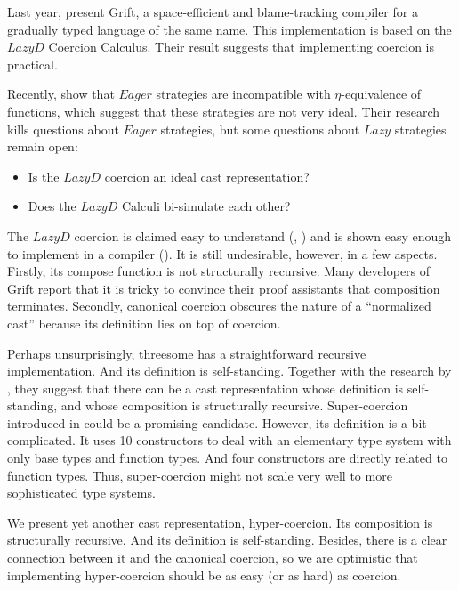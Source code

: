 \documentclass[acmsmall,review,anonymous]{acmart}\settopmatter{printfolios=true,printccs=false,printacmref=false}
\begin{document}
Last year, \citet{kuhlenschmidt2018efficient} present Grift, a space-efficient 
and blame-tracking compiler for a gradually typed language of the same name. 
This implementation is based on the $ Lazy D $ Coercion Calculus.
Their result suggests that implementing coercion is practical.

Recently, \citet{new2019gradual} show that $ Eager $ strategies are 
incompatible with $\eta$-equivalence of functions, which suggest that these 
strategies are not very ideal. Their research kills questions about $ Eager $ 
strategies, but some questions about $ Lazy $ strategies remain open:

\begin{itemize}
	\item Is the $ Lazy D $ coercion an ideal cast representation?
	\item Does the $ Lazy D $ Calculi bi-simulate each other?
\end{itemize}

The $ Lazy D $ coercion is claimed easy to understand 
(\cite{garcia2013calculating}, \cite{siek2015blame}) and is shown 
easy enough to implement in a compiler (\cite{kuhlenschmidt2018efficient}).
It is still undesirable, however, in a 
few aspects. Firstly, its compose function is not structurally recursive. Many 
developers of Grift report that it is tricky to convince their 
proof assistants that composition terminates. Secondly, canonical coercion
obscures the nature of a ``normalized cast'' because its definition lies on 
top of coercion. 

Perhaps unsurprisingly, threesome has a straightforward recursive 
implementation. And its definition is self-standing. Together with the research 
by \citet{garcia2013calculating}, they suggest that there can be a cast 
representation whose definition is self-standing, and whose composition is 
structurally recursive. Super-coercion introduced in 
\citet{garcia2013calculating} could 
be a promising candidate. However, its definition is a bit complicated. It uses 
10 constructors to deal with an elementary type system with only base types and 
function types. And four constructors are directly related to 
function types. Thus, super-coercion might not scale very well to more 
sophisticated type systems.

We present yet another cast representation, hyper-coercion. Its 
composition is structurally recursive. And its definition is self-standing. 
Besides, there is a clear connection between it and the canonical coercion, 
so we are optimistic that implementing hyper-coercion should be as easy (or 
as hard) as coercion.
\end{document}
